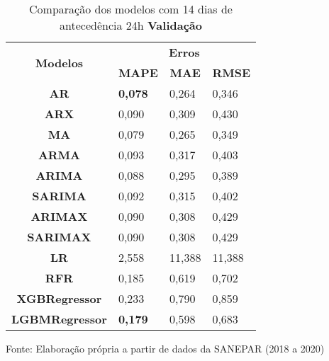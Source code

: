 \begin{table}[H]
	\centering
	\caption{Comparação dos modelos com 14 dias de antecedência 24h \textbf{Validação} }\label{tb:30-24vld}
	\begin{tabular}{@{}clll@{}}
		\toprule
		\multirow{2}{*}{\textbf{Modelos}} & \multicolumn{3}{c}{\textbf{Erros}}                                                                       \\ \cmidrule(l){2-4} 
		& \multicolumn{1}{c}{\textbf{MAPE}} & \multicolumn{1}{c}{\textbf{MAE}} & \multicolumn{1}{c}{\textbf{RMSE}} \\ \hline
\textbf{AR}                       & \textbf{0,078}                             & 0,264                            & 0,346                             \\
\textbf{ARX}                      & 0,090                             & 0,309                            & 0,430                             \\
\textbf{MA}                       & 0,079                             & 0,265                            & 0,349                             \\
\textbf{ARMA}                     & 0,093                             & 0,317                            & 0,403                             \\
\textbf{ARIMA}                    & 0,088                             & 0,295                            & 0,389                             \\
\textbf{SARIMA}                   & 0,092                             & 0,315                            & 0,402                             \\
\textbf{ARIMAX}                   & 0,090                             & 0,308                            & 0,429                             \\
\textbf{SARIMAX}                  & 0,090                             & 0,308                            & 0,429                             \\
\textbf{LR}                       & 2,558                             & 11,388                           & 11,388                            \\
\textbf{RFR}                      & 0,185                             & 0,619                            & 0,702                             \\
\textbf{XGBRegressor}             & 0,233                             & 0,790                            & 0,859                             \\
\textbf{LGBMRegressor}            & \textbf{0,179}                             & 0,598                            & 0,683                             \\ \bottomrule
	\end{tabular}

Fonte: Elaboração própria a partir de dados da SANEPAR (2018 a 2020)
\end{table}

